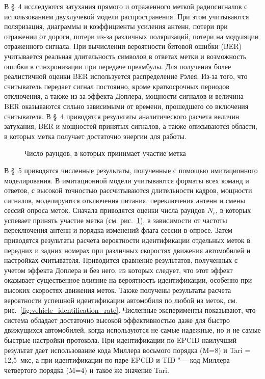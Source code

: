 В \S~4 исследуются затухания прямого и отраженного меткой радиосигналов с использованием двухлучевой модели распространения. При этом учитываются поляризация, диаграммы и коэффициенты усиления антенн, потери при отражении от дороги, потери из-за различных поляризаций, потери на модуляции отраженного сигнала. При вычислении вероятности битовой ошибки (BER) учитывается реальная длительность символов в ответах метки и возможность ошибки в синхронизации при передаче преамбулы. Для получения более реалистичной оценки BER используется распределение Рэлея. Из-за того, что считыватель передает сигнал постоянно, кроме краткосрочных периодов отключения, а также из-за эффекта Доплера, мощности сигналов и величина BER оказываются сильно зависимыми от времени, прошедшего со включения считывателя. В \S~4 приводятся результаты аналитического расчета величин затухания, BER и мощностей принятых сигналов, а также описываются области, в которых метка получает достаточно энергии для работы.

\begin{figure}[ht]
  \caption{Число раундов, в которых принимает участие метка}\label{fig:rounds_per_tag}
\end{figure}

В \S~5 приводятся численные результаты, полученные с помощью имитационного моделирования. В имитационной модели учитываются форматы всех команд и ответов, с высокой точностью рассчитываются длительности кадров, мощности сигналов, моделируются отключения питания, переключения антенн и смены сессий опроса меток. Сначала приводятся оценки числа раундов $N_r$, в которых успевает принять участие метка (см. рис.~\ref{fig:rounds_per_tag}), в зависимости от частоты переключения антенн и порядка изменений флага сессии в опросе. Затем приводятся результаты расчета вероятности идентификации отдельных меток в передних и задних номерах при различных скоростях движения автомобилей и настройках считывателя. Приводится сравнение результатов, полученных с учетом эффекта Доплера и без него, из которых следует, что этот эффект оказывает существенное влияние на вероятность идентификации, особенно при высоких скоростях движения меток. Также получены результаты расчета вероятности успешной идентификации автомобиля по любой из меток, см. рис.~\ref{fig:vehicle_identification_rate}. Численные эксперименты показывают, что система обладает достаточно высокой эффективностью даже для быстро движущихся автомобилей, когда используются не самые надежные, но и не самые быстрые настройки протокола. При идентификации по EPCID наилучший результат дает использование кода Миллера восьмого порядка (M=8) и Tari = 12,5~мкс, а при идентификации по паре EPCID и TID "--- код Миллера четвертого порядка (M=4) и такое же значение Tari.

